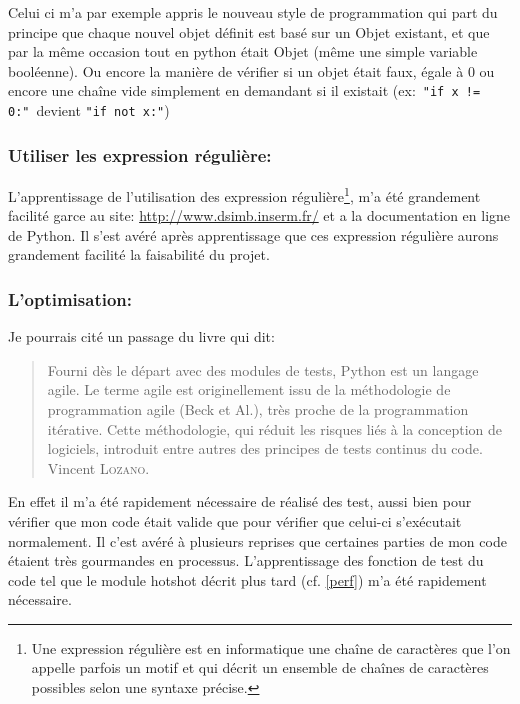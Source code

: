 Celui ci m'a par exemple appris le nouveau style de programmation qui part du principe que chaque nouvel objet définit est basé sur un Objet existant, et que par la même occasion tout en python était Objet (même une simple variable booléenne). Ou encore la manière de vérifier si un objet était faux, égale à 0 ou encore une chaîne vide simplement en demandant si il existait (ex:~\texttt{"if x != 0:"}~devient \texttt{"if not x:"})

        \subsubsection{Utiliser les expression régulière:} 
L'apprentissage de l'utilisation des expression régulière\footnote{Une expression régulière
 est en informatique une chaîne de caractères que l’on appelle parfois un motif et qui décrit un ensemble de chaînes de caractères possibles selon une syntaxe précise.}, m'a été grandement facilité garce au site: \url{http://www.dsimb.inserm.fr/}\cite{re} et a la documentation en ligne de Python\cite{pydoc}. Il s'est avéré après apprentissage que ces expression régulière aurons grandement facilité la faisabilité du projet.

        \subsubsection{L'optimisation:}
Je pourrais cité un passage du livre\cite{pybook} qui dit:
\begin{quotation}
    Fourni dès le départ avec des modules de tests, Python est un langage agile. Le terme agile est originellement issu de la méthodologie de programmation agile (Beck et Al.), très proche de la programmation itérative. Cette méthodologie, qui réduit les risques liés à la conception de logiciels, introduit entre autres des principes de tests continus du code.
    \raggedleft Vincent \textsc{Lozano}.
\end{quotation}

En effet il m'a été rapidement nécessaire de réalisé des test, aussi bien pour vérifier que mon code était valide que pour vérifier que celui-ci s’exécutait normalement. Il c'est avéré à plusieurs reprises que certaines parties de mon code étaient très gourmandes en processus. L’apprentissage des fonction de test du code tel que le module hotshot décrit plus tard (cf. \vref{perf}) m'a été rapidement nécessaire.

